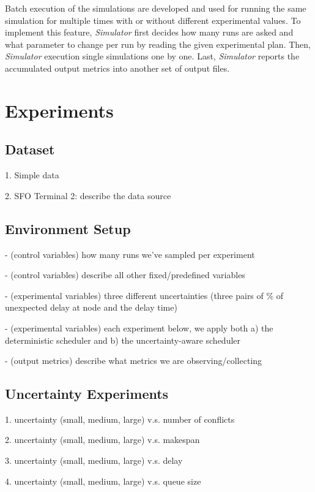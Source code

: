 \documentclass[letterpaper, 10 pt, conference]{ieeeconf}
\begin{document}
Batch execution of the simulations are developed and used for running the same simulation for multiple times with or without different experimental values. To implement this feature, {\it Simulator} first decides how many runs are asked and what parameter to change per run by reading the given experimental plan. Then, {\it Simulator} execution single simulations one by one. Last, {\it Simulator} reports the accumulated output metrics into another set of output files.

\section{Experiments}

\subsection{Dataset}

1. Simple data

2. SFO Terminal 2: describe the data source

\subsection{Environment Setup}

- (control variables) how many runs we've sampled per experiment

- (control variables) describe all other fixed/predefined variables

- (experimental variables) three different uncertainties (three pairs of \% of unexpected delay at node and the delay time)

- (experimental variables) each experiment below, we apply both a) the deterministic scheduler and b) the uncertainty-aware scheduler

- (output metrics) describe what metrics we are observing/collecting

\subsection{Uncertainty Experiments}

1. uncertainty (small, medium, large) v.s. number of conflicts

2. uncertainty (small, medium, large) v.s. makespan

3. uncertainty (small, medium, large) v.s. delay

4. uncertainty (small, medium, large) v.s. queue size
\end{document}
